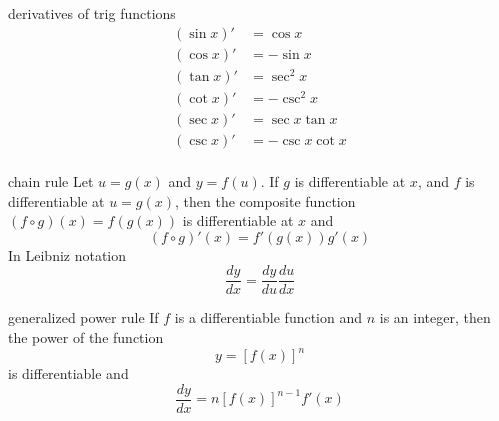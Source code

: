 \documentclass[avery5371,grid]{flashcards}
\begin{document}
\begin{flashcard}[Theorem]{derivatives of trig functions}
\begin{align*}
(\sin x)' & = \cos x \\
(\cos x)' & = -\sin x \\
(\tan x)' & = \sec^2 x \\
(\cot x)' & = -\csc^2 x \\
(\sec x)' & = \sec x \tan x \\
(\csc x)' & = -\csc x \cot x \\
\end{align*}
\end{flashcard}

\begin{flashcard}[Theorem]{chain rule}
Let $u=g(x)$ and $y=f(u)$.  If $g$ is differentiable at $x$, and 
$f$ is differentiable at $u=g(x)$, then the composite function
$(f\circ g)(x) = f(g(x))$ is differentiable at $x$ and
\begin{equation*}
(f\circ g)'(x) = f'(g(x)) g'(x)
\end{equation*} 
In Leibniz notation
\begin{equation*}
\dfrac{dy}{dx}=\dfrac{dy}{du} \dfrac{du}{dx}
\end{equation*}
\end{flashcard}

\begin{flashcard}[Theorem]{generalized power rule}
If $f$ is a differentiable function and $n$ is an integer, then
the power of the function
\begin{equation*}
y = \left[ f(x) \right]^{n}
\end{equation*}
is differentiable and
\begin{equation*}
\dfrac{dy}{dx} = n\left[ f(x) \right]^{n-1}f'(x)
\end{equation*}
\end{flashcard}
\end{document}
